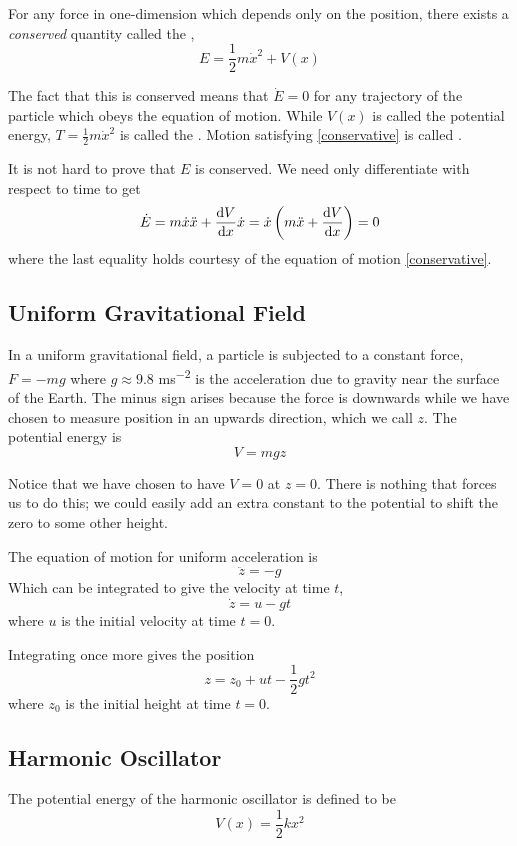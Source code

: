 For any force in one-dimension which depends only on the position, there exists a \emph{conserved} quantity called the ,
\[ E = \frac{1}{2}m\dot{x}^2 + V(x) \]

The fact that this is conserved means that $\dot{E} = 0$ for any trajectory of the particle which obeys the equation of motion. While $V(x)$ is called the potential energy, $T=\frac{1}{2}m\dot{x}^2$ is called the . Motion satisfying \cref{conservative} is called .

It is not hard to prove that $E$ is conserved. We need only differentiate with respect to time to get
\[ \dot{E} = m\dot{x}\ddot{x} + \dv{V}{x}\dot{x} = \dot{x}\left(m\ddot{x}+\dv{V}{x}\right) = 0 \]
where the last equality holds courtesy of the equation of motion \cref{conservative}.

\subsection{Uniform Gravitational Field}
In a uniform gravitational field, a particle is subjected to a constant force, $F=-mg$ where $g \approx 9.8$  \unit{ms^{-2}} is the acceleration due to gravity near the surface of the Earth. The minus sign arises because the force is downwards while we have chosen to measure position in an upwards direction, which we call $z$. The potential energy is
\begin{equation}
V = mgz
\end{equation}

\begin{remark}
Notice that we have chosen to have $V=0$ at $z=0$. There is nothing that forces us to do this; we could easily add an extra constant to the potential to shift the zero to some other height.
\end{remark}

The equation of motion for uniform acceleration is
\[ \ddot{z}=-g \]
Which can be integrated to give the velocity at time $t$,
\[ \dot{z} = u - gt \]
where $u$ is the initial velocity at time $t=0$.

Integrating once more gives the position
\[ z = z_0 + ut - \frac{1}{2}gt^2 \]
where $z_0$ is the initial height at time $t=0$.

\subsection{Harmonic Oscillator}
The potential energy of the harmonic oscillator is defined to be
\[ V(x) = \frac{1}{2}kx^2 \]

